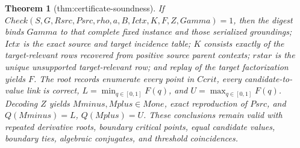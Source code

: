 \documentclass{article}
\newtheorem{theorem}{Theorem}
\begin{document}
\begin{theorem}[thm:certificate-soundness]\label{thm:certificate-soundness}
If \(Check(S,G,Rsrc,Psrc,rho,a,B,Ictx,K,F,Z,Gamma)=1\), then the digest binds \(Gamma\) to that complete fixed instance and those serialized groundings; \(Ictx\) is the exact source and target incidence table; \(K\) consists exactly of the target-relevant rows recovered from positive source parent contexts; \(rstar\) is the unique unsupported target-relevant row; and replay of the target factorization yields \(F\). The root records enumerate every point in \(Ccrit\), every candidate-to-value link is correct, \(L=\min_{q\in[0,1]}F(q)\), and \(U=\max_{q\in[0,1]}F(q)\). Decoding \(Z\) yields \(Mminus,Mplus\in Mone\), exact reproduction of \(Psrc\), and \(Q(Mminus)=L\), \(Q(Mplus)=U\). These conclusions remain valid with repeated derivative roots, boundary critical points, equal candidate values, boundary ties, algebraic conjugates, and threshold coincidences.
\end{theorem}
\end{document}
